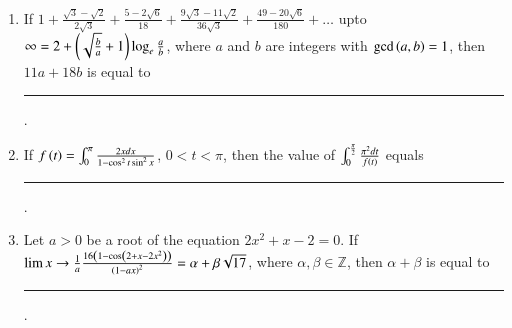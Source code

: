 \documentclass[journal,12pt,onecolumn]{IEEEtran}
\theoremstyle{remark}
\begin{document}
\begin{enumerate}
\hfill{}

\item If $1+\frac{\sqrt{3}-\sqrt{2}}{2\sqrt{3}}+\frac{5-2\sqrt{6}}{18}+\frac{9\sqrt{3}-11\sqrt{2}}{36\sqrt{3}}+\frac{49-20\sqrt{6}}{180}+\dots$ upto $\infty=2+\left(\sqrt{\frac{b}{a}}+1\right)\log_e{\frac{a}{b}}$, where $a$ and $b$ are integers with $\gcd\left(a,b\right)=1$, then $11a+18b$ is equal to \rule{1cm}{0.15mm}. 

\hfill{}

\item If $f\left(t\right)=\int_{0}^{\pi}\frac{2xdx}{1-\cos^{2}t\sin^{2}x}$, $0<t<\pi$, then the value of $\int_{0}^{\frac{\pi}{2}}\frac{\pi^{2}dt}{f\left(t\right)}$ equals \rule{1cm}{0.15mm}.

\hfill{}

\item Let $a>0$ be a root of the equation $2x^2+x-2=0$. If $\lim{x\to\frac{1}{a}}\frac{16\left(1-\cos\left(2+x-2x^2\right)\right)}{\left(1-ax\right)^2}=\alpha+\beta\sqrt{17}$, where $\alpha,\beta\in\mathbb{Z}$, then $\alpha+\beta$ is equal to \rule{1cm}{0.15mm}.

\hfill{}

\end{enumerate}
\end{document}

